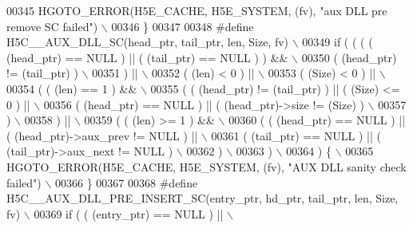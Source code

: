 \begin{DoxyCode}
00345 \textcolor{preprocessor}{    HGOTO\_ERROR(H5E\_CACHE, H5E\_SYSTEM, (fv), "aux DLL pre remove SC failed")   \(\backslash\)}
00346 \textcolor{preprocessor}{\}}
00347 
00348 \textcolor{preprocessor}{#define H5C\_\_AUX\_DLL\_SC(head\_ptr, tail\_ptr, len, Size, fv)                  \(\backslash\)}
00349 \textcolor{preprocessor}{if ( ( ( ( (head\_ptr) == NULL ) || ( (tail\_ptr) == NULL ) ) &&              \(\backslash\)}
00350 \textcolor{preprocessor}{       ( (head\_ptr) != (tail\_ptr) )                                         \(\backslash\)}
00351 \textcolor{preprocessor}{     ) ||                                                                   \(\backslash\)}
00352 \textcolor{preprocessor}{     ( (len) < 0 ) ||                                                       \(\backslash\)}
00353 \textcolor{preprocessor}{     ( (Size) < 0 ) ||                                                      \(\backslash\)}
00354 \textcolor{preprocessor}{     ( ( (len) == 1 ) &&                                                    \(\backslash\)}
00355 \textcolor{preprocessor}{       ( ( (head\_ptr) != (tail\_ptr) ) || ( (Size) <= 0 ) ||                 \(\backslash\)}
00356 \textcolor{preprocessor}{         ( (head\_ptr) == NULL ) || ( (head\_ptr)->size != (Size) )           \(\backslash\)}
00357 \textcolor{preprocessor}{       )                                                                    \(\backslash\)}
00358 \textcolor{preprocessor}{     ) ||                                                                   \(\backslash\)}
00359 \textcolor{preprocessor}{     ( ( (len) >= 1 ) &&                                                    \(\backslash\)}
00360 \textcolor{preprocessor}{       ( ( (head\_ptr) == NULL ) || ( (head\_ptr)->aux\_prev != NULL ) ||      \(\backslash\)}
00361 \textcolor{preprocessor}{         ( (tail\_ptr) == NULL ) || ( (tail\_ptr)->aux\_next != NULL )         \(\backslash\)}
00362 \textcolor{preprocessor}{       )                                                                    \(\backslash\)}
00363 \textcolor{preprocessor}{     )                                                                      \(\backslash\)}
00364 \textcolor{preprocessor}{   ) \{                                                                      \(\backslash\)}
00365 \textcolor{preprocessor}{    HGOTO\_ERROR(H5E\_CACHE, H5E\_SYSTEM, (fv), "AUX DLL sanity check failed") \(\backslash\)}
00366 \textcolor{preprocessor}{\}}
00367 
00368 \textcolor{preprocessor}{#define H5C\_\_AUX\_DLL\_PRE\_INSERT\_SC(entry\_ptr, hd\_ptr, tail\_ptr, len, Size, fv) \(\backslash\)}
00369 \textcolor{preprocessor}{if ( ( (entry\_ptr) == NULL ) ||                                                \(\backslash\)}

\end{DoxyCode}
